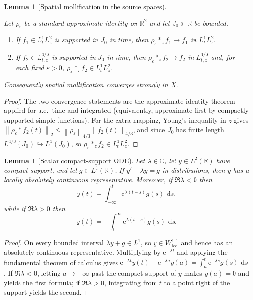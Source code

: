 \documentclass[11pt,oneside]{book}
\providecommand{\uses}[1]{}
\newtheorem{lemma}[theorem]{Lemma}
\theoremstyle{definition}
\theoremstyle{remark}
\newcommand{\R}{\mathbb R}
\newcommand{\C}{\mathbb C}
\newcommand{\1}{\mathbf 1}
\newcommand{\loc}{\mathrm{loc}}
\newcommand{\dd}{\,\mathrm d}
\newcommand{\norm}[1]{\left\lVert #1\right\rVert}
\newcommand{\e}{\mathrm e}
\newcommand{\eps}{\varepsilon}
\begin{document}
\begin{lemma}[Spatial mollification in the source spaces]\label{lem:spatial-mollification-source}
\uses{def:carleman-spaces}
Let $\rho_\eps$ be a standard approximate identity on $\R^2$ and let $J_0\Subset\R$ be
bounded.
\begin{enumerate}
\item If $f_1\in L^1_tL^2_z$ is supported in $J_0$ in time, then
      $\rho_\eps*_zf_1\to f_1$ in $L^1_tL^2_z$.
\item If $f_2\in L^{4/3}_{t,z}$ is supported in $J_0$ in time, then
      $\rho_\eps*_zf_2\to f_2$ in $L^{4/3}_{t,z}$ and, for each fixed $\eps>0$,
      $\rho_\eps*_zf_2\in L^1_tL^2_z$.
\end{enumerate}
Consequently spatial mollification converges strongly in $X$.
\end{lemma}

\begin{proof}
The two convergence statements are the approximate-identity theorem applied for a.e.\ time
and integrated (equivalently, approximate first by compactly supported simple functions).
For the extra mapping, Young's inequality in $z$ gives
$\norm{\rho_\eps*f_2(t)}_2\le\norm{\rho_\eps}_{4/3}\norm{f_2(t)}_{4/3}$, and since $J_0$ has
finite length $L^{4/3}(J_0)\hookrightarrow L^1(J_0)$, so $\rho_\eps*_zf_2\in L^1_tL^2_z$.
\end{proof}

\begin{lemma}[Scalar compact-support ODE]\label{lem:compact-support-ODE}
Let $\lambda\in\C$, let $y\in L^2(\R)$ have compact support, and let $g\in L^1(\R)$. If
$y'-\lambda y=g$ in distributions, then $y$ has a locally absolutely continuous
representative. Moreover, if $\Re\lambda<0$ then
\[
 y(t)=\int_{-\infty}^t\e^{\lambda(t-s)}g(s)\,\dd s,
\]
while if $\Re\lambda>0$ then
\[
 y(t)=-\int_t^\infty\e^{\lambda(t-s)}g(s)\,\dd s.
\]
\end{lemma}

\begin{proof}
On every bounded interval $\lambda y+g\in L^1$, so $y\in W^{1,1}_{\loc}$ and hence has an
absolutely continuous representative. Multiplying by $\e^{-\lambda t}$ and applying the
fundamental theorem of calculus gives
$\e^{-\lambda t}y(t)-\e^{-\lambda a}y(a)=\int_a^t\e^{-\lambda s}g(s)\,\dd s$. If
$\Re\lambda<0$, letting $a\to-\infty$ past the compact support of $y$ makes $y(a)=0$ and
yields the first formula; if $\Re\lambda>0$, integrating from $t$ to a point right of the
support yields the second.
\end{proof}
\end{document}
